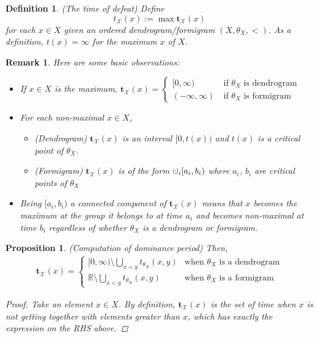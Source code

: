 \documentclass[a4paper,12pt]{article}
\newtheorem{remark}{Remark}[section]
\newtheorem{proposition}{Proposition}[section]
\newtheorem{definition}{Definition}[section]
\newcommand{\dotcup}{\ensuremath{\mathaccent\cdot\cup}}
\begin{document}
\begin{definition} (The time of defeat) Define $$t_\mathcal{X}(x):=\max \mathbf{t}_{\mathcal{X}}(x)$$ for each $x\in X$ given an ordered dendrogram/formigram $(X,\theta_X, <)$.  As a definition, $t(x)=\infty$ for the maximum $x$ of $X$. \label{defeat2}
\end{definition}

\begin{remark} Here are some basic observations:
\begin{itemize}
\item If $x\in X$ is the maximum, $\mathbf{t}_{\mathcal{X}}(x)=\begin{cases}[0,\infty)&\ \mbox{if $\theta_X$ is dendrogram}\\(-\infty, \infty)&\ \mbox{if $\theta_X$ is formigram}
\end{cases}$
\item For each non-maximal $x\in X$, 
\begin{itemize}
\item[-](Dendrogram) $\mathbf{t}_{\mathcal{X}}(x)$ is an interval $[0,t(x))$ and $t(x)$ is a critical point of $\theta_X$.
\item[-](Formigram) $\mathbf{t}_{\mathcal{X}}(x)$ is of the form $\dotcup_i[a_i,b_i)$ where $a_i$, $b_i$ are critical points of $\theta_X$ 
\end{itemize}

\item Being $[a_i,b_i)$ a connected component of $\mathbf{t}_{\mathcal{X}}(x)$ means that $x$ becomes the maximum at the group it belongs to at time $a_i$ and becomes non-maximal at time $b_i$ regardless of whether $\theta_X$ is a dendrogram or formigram.    
\end{itemize}

\end{remark}


\begin{proposition}\label{dominance}(Computation of dominance period) Then, 
\begin{align*}
\mathbf{t}_{\mathcal{X}}(x)=\begin{cases}[0,\infty) \setminus \bigcup_{x<y} t_{\theta_X}(x,y)&\mbox{when $\theta_X$ is a dendrogram}\\\mathbb{R}\setminus \bigcup_{x<y} t_{\theta_X}(x,y)&\mbox{when $\theta_X$ is a formigram}\end{cases}
\end{align*}
\begin{proof} Take an element $x\in X$. By definition, $\mathbf{t}_{\mathcal{X}}(x)$ is the set of time when $x$ is not getting together with elements greater than $x$, which has exactly the expression on the RHS above. 

\end{proof}

\end{proposition}
\end{document}
